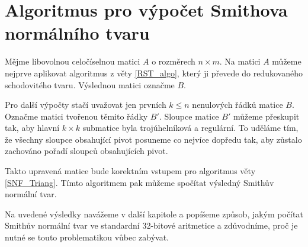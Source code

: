 \section{Algoritmus pro výpočet Smithova normálního tvaru}
Mějme libovolnou celočíselnou matici $ A $ o rozměrech $ n \times m $. Na matici
$ A $ můžeme nejprve aplikovat algoritmus z věty \ref{RST_algo}, který ji
převede do redukovaného schodovitého tvaru. Výslednou matici označme $ B $.

Pro další výpočty stačí uvažovat jen prvních $ k \leq n $ nenulových řádků
matice $ B $. Označme matici tvořenou těmito řádky $ B' $. Sloupce
matice $ B' $ můžeme přeskupit tak, aby hlavní $ k \times k $
submatice byla trojúhelníková a regulární. To uděláme tím, že všechny sloupce
obsahující pivot posuneme co nejvíce dopředu tak, aby zůstalo zachováno pořadí
sloupců obsahujících pivot.

Takto upravená matice bude korektním vstupem pro algoritmus věty
\ref{SNF_Triang}. Tímto algoritmem pak můžeme spočítat výsledný Smithův normální
tvar.

Na uvedené výsledky navážeme v další kapitole a popíšeme způsob, jakým počítat
Smithův normální tvar ve standardní 32-bitové aritmetice a zdůvodníme, proč 
je nutné se touto problematikou vůbec zabývat.
